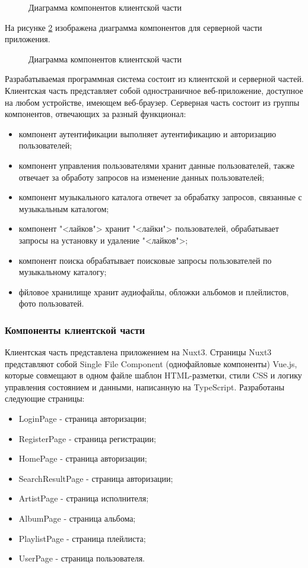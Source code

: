 \begin{figure}[ht]
\caption{Диаграмма компонентов клиентской части}
\label{frontendComponents:image}
\end{figure}

На рисунке \ref{backendComp:image} изображена диаграмма компонентов для серверной части приложения.

\begin{figure}[ht]
	\caption{Диаграмма компонентов клиентской части}
	\label{backendComp:image}
\end{figure}

Разрабатываемая программная система состоит из клиентской и серверной частей. Клиентская часть представляет собой одностраничное веб-приложение, доступное на любом устройстве, имеющем веб-браузер.
Серверная часть состоит из группы компонентов, отвечающих за разный функционал:
\begin{itemize}
	\item компонент аутентификации выполняет аутентификацию и авторизацию пользователей;
	\item компонент управления пользователями хранит данные пользователей, также отвечает за обработу запросов на изменение данных пользователей;
	\item компонент музыкального каталога отвечет за обрабатку запросов, связанные с музыкальным каталогом;
	\item компонент "<лайков"> хранит "<лайки"> пользователей, обрабатывает запросы на установку и удаление "<лайков">;
	\item компонент поиска обрабатывает поисковые запросы пользователей по музыкальному каталогу;
	\item фйловое хранилище хранит аудиофайлы, обложки альбомов и плейлистов, фото пользоватей.
\end{itemize}

\subsubsection{Компоненты клиентской части}

Клиентская часть представлена приложением на Nuxt3. Страницы Nuxt3 представляют собой Single File Component (однофайловые компоненты) Vue.js, которые совмещают в одном файле шаблон HTML-разметки, стили CSS и логику управления состоянием и данными, написанную на TypeScript.
Разработаны следующие страницы:
\begin{itemize}[]
	\item LoginPage - страница авторизации;
	\item RegisterPage - страница регистрации;
	\item HomePage - страница авторизации;
	\item SearchResultPage - страница авторизации;
	\item ArtistPage - страница исполнителя;
	\item AlbumPage - страница альбома;
	\item PlaylistPage - страница плейлиста;
	\item UserPage - страница пользователя.
\end{itemize}

